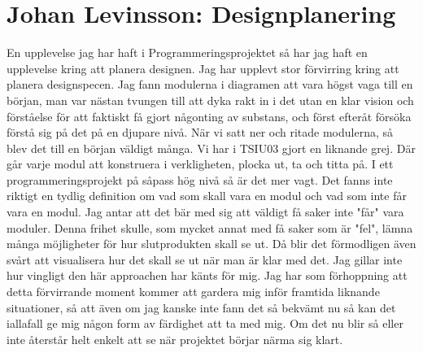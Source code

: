\section{Johan Levinsson: Designplanering}

En upplevelse jag har haft i Programmeringsprojektet så har jag haft en upplevelse kring att planera designen. Jag har upplevt stor förvirring kring att planera designspecen. Jag fann modulerna i diagramen att vara högst vaga till en början, man var nästan tvungen till att dyka rakt in i det utan en klar vision och förståelse för att faktiskt få gjort någonting av substans, och först efteråt  försöka förstå sig på det på en djupare nivå.
När vi satt ner och ritade modulerna, så blev det till en början väldigt många. Vi har i TSIU03 gjort en liknande grej. Där går varje modul att konstruera i verkligheten, plocka ut, ta och titta på. I ett programmeringsprojekt på såpass hög nivå så är det mer vagt. Det fanns inte riktigt en tydlig definition om vad som skall vara en modul och vad som inte får vara en modul. Jag antar att det bär med sig att väldigt få saker inte "får" vara moduler. Denna frihet skulle, som mycket annat med få saker som är "fel", lämna många möjligheter för hur slutprodukten skall se ut. Då blir det förmodligen även svårt att visualisera hur det skall se ut när man är klar med det. 
Jag gillar inte hur vingligt den här approachen har känts för mig. Jag har som förhoppning att detta förvirrande moment kommer att gardera mig inför framtida liknande situationer, så att även om jag kanske inte fann det så bekvämt nu så kan det iallafall ge mig någon form av färdighet att ta med mig. Om det nu blir så eller inte återstår helt enkelt att se när projektet börjar närma sig klart. 
